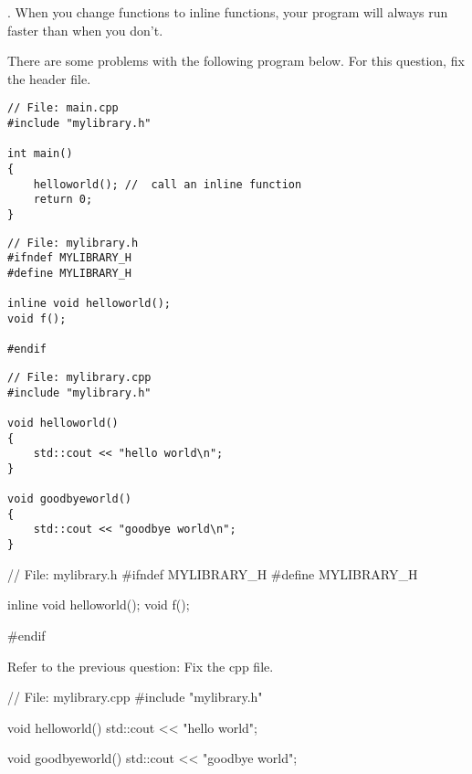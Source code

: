 

\nextq
\tf. When you change functions to inline functions, your
program will always run faster than when you don't.
\\
\ANSWER
\begin{answercode}

\end{answercode}

\nextq
There are some problems with the following program below.
For this question, fix the header file.
\begin{Verbatim}[frame=single,fontsize=\footnotesize]
// File: main.cpp
#include "mylibrary.h"

int main()
{
    helloworld(); //  call an inline function
    return 0;
}
\end{Verbatim}
\begin{Verbatim}[frame=single,fontsize=\footnotesize]
// File: mylibrary.h
#ifndef MYLIBRARY_H
#define MYLIBRARY_H

inline void helloworld();
void f();

#endif
\end{Verbatim}
\begin{Verbatim}[frame=single,fontsize=\footnotesize]
// File: mylibrary.cpp
#include "mylibrary.h"

void helloworld()
{
    std::cout << "hello world\n";
}

void goodbyeworld()
{
    std::cout << "goodbye world\n";
}
\end{Verbatim}
\ANSWER
\begin{answercode}
// File: mylibrary.h
#ifndef MYLIBRARY_H
#define MYLIBRARY_H

inline void helloworld();
void f();

#endif
\end{answercode}

\nextq
Refer to the previous question: Fix the cpp file.
\\
\ANSWER
\begin{answercode}
// File: mylibrary.cpp
#include "mylibrary.h"

void helloworld()
{
    std::cout << "hello world\n";
}

void goodbyeworld()
{
    std::cout << "goodbye world\n";
}
\end{answercode}

